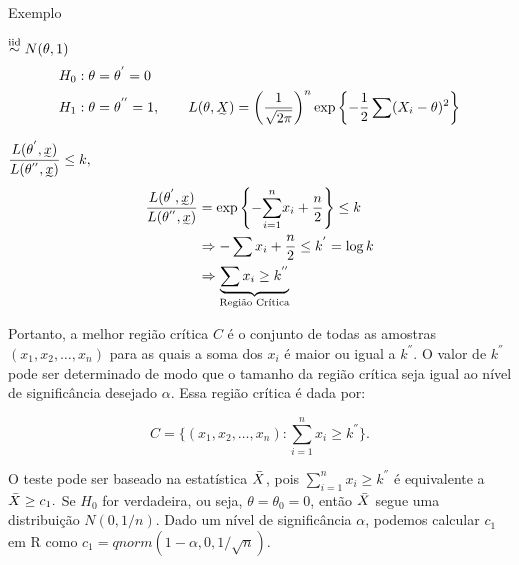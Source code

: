 \documentclass[12pt]{beamer}
\begin{document}
\begin{frame}{Exemplo}
\begin{block}{}
\justifying
\seqX$\overset{\text{iid}}{\sim} N(\theta,1)$
\begin{align*}
    H_{0}:\theta&=\theta^{'}=0\\
    H_{1}:\theta&=\theta^{''}=1,\quad \quad L(\theta,\undertilde{X})=\left(\dfrac{1}{\sqrt{2\pi}}\right)^{n}\exp{\left\{-\frac{1}{2}\sum(X_{i}-\theta)^{2}\right\}}
\end{align*}
\end{block}
\end{frame}

\begin{frame}{}
\begin{block}{}
\justifying
$\dfrac{L(\theta^{'},\undertilde{x})}{L(\theta^{''},\undertilde{x})}\leq k,$
\begin{align*}
\dfrac{L(\theta^{'},\undertilde{x})}{L(\theta^{''},\undertilde{x})}&=\exp{\left\{-\Sumi x_{i}+\frac{n}{2}\right\}}\leq k\\
&\Rightarrow -\sum x_{i}+\frac{n}{2}\leq k^{'}=\log{k}\\
&\Rightarrow \underbrace{\sum x_{i}\geq k^{''}}_{\text{Região Crítica}}
\end{align*}
\end{block}
\end{frame}

\begin{frame}{}
\begin{block}{}
\justifying
Portanto, a melhor região crítica $C$ é o conjunto de todas as amostras $(x_1, x_2, \ldots, x_n)$ para as quais a soma dos $x_i$ é maior ou igual a $k^{''}$. O valor de $k^{''}$ pode ser determinado de modo que o tamanho da região crítica seja igual ao nível de significância desejado $\alpha$. Essa região crítica é dada por:

\[
C = \{(x_1, x_2, \ldots, x_n) : \sum_{i=1}^n x_i \geq k^{''}\}.
\]

O teste pode ser baseado na estatística $\Bar{X}$, pois $\sum_{i=1}^n x_i \geq k^{''}$ é equivalente a $\Bar{X}\geq c_{1}.$ Se $H_0$ for verdadeira, ou seja, $\theta = \theta_0 = 0$, então $\Bar{X}$ segue uma distribuição $N(0, 1/n)$. Dado um nível de significância $\alpha$, podemos calcular $c_{1}$ em R como $c_{1} = qnorm(1-\alpha, 0, 1/\sqrt{n})$.



\end{block}
\end{frame}
\end{document}
